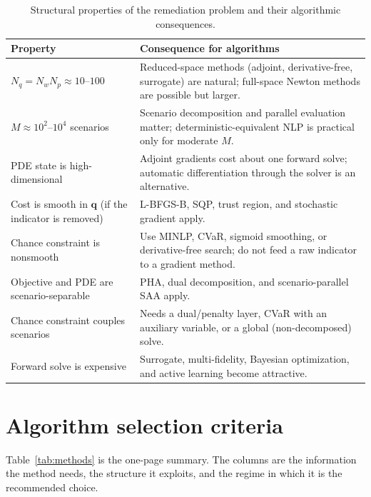 \documentclass[11pt]{article}
\numberwithin{equation}{section}
\newcommand{\qq}{\mathbf{q}}
\newcommand{\tabhead}[1]{\textbf{#1}}
\theoremstyle{plain}
\begin{document}
\begin{table}[htbp]
\centering
\small
\begin{tabularx}{\textwidth}{@{}lY@{}}
\toprule
\tabhead{Property} & \tabhead{Consequence for algorithms}\\
\midrule
$N_q=N_wN_p\approx10$--$100$ & Reduced-space methods (adjoint, derivative-free,
surrogate) are natural; full-space Newton methods are possible but larger.\\
$M\approx10^2$--$10^4$ scenarios & Scenario decomposition and parallel evaluation
matter; deterministic-equivalent NLP is practical only for moderate $M$.\\
PDE state is high-dimensional & Adjoint gradients cost about one forward solve;
automatic differentiation through the solver is an alternative.\\
Cost is smooth in $\qq$ (if the indicator is removed) & L-BFGS-B, SQP, trust
region, and stochastic gradient apply.\\
Chance constraint is nonsmooth & Use MINLP, CVaR, sigmoid smoothing, or
derivative-free search; do not feed a raw indicator to a gradient method.\\
Objective and PDE are scenario-separable & PHA, dual decomposition, and
scenario-parallel SAA apply.\\
Chance constraint couples scenarios & Needs a dual/penalty layer, CVaR with an
auxiliary variable, or a global (non-decomposed) solve.\\
Forward solve is expensive & Surrogate, multi-fidelity, Bayesian optimization,
and active learning become attractive.\\
\bottomrule
\end{tabularx}
\caption{Structural properties of the remediation problem and their algorithmic
consequences.}
\label{tab:structure}
\end{table}

\section{Algorithm selection criteria}
\label{sec:selection}

Table~\ref{tab:methods} is the one-page summary.  The columns are the
information the method needs, the structure it exploits, and the regime in
which it is the recommended choice.
\end{document}
